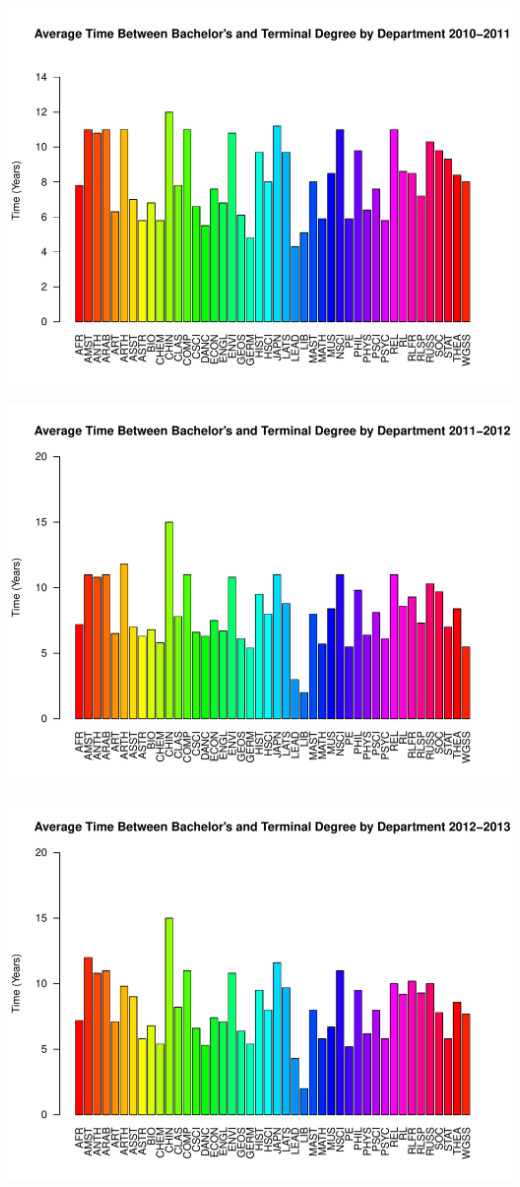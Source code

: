 \documentclass[12pt,a4paper]{article}\usepackage[]{graphicx}\usepackage[]{color}
\makeatletter
\def\maxwidth{ %
  \ifdim\Gin@nat@width>\linewidth
    \linewidth
  \else
    \Gin@nat@width
  \fi
}
\newenvironment{knitrout}{}{} %
\theoremstyle{definition}
\makeatother
\begin{document}
\begin{knitrout}
\includegraphics[width=\maxwidth]{figure/unnamed-chunk-13-7} 

\includegraphics[width=\maxwidth]{figure/unnamed-chunk-13-8} 

\includegraphics[width=\maxwidth]{figure/unnamed-chunk-13-9} 


\end{knitrout}
\end{document}
